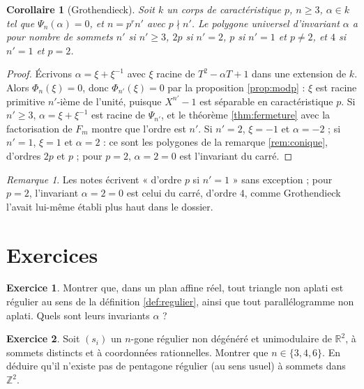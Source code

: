 \documentclass[11pt,a4paper]{article}
\theoremstyle{plain}
\newtheorem{corollaire}[theoreme]{Corollaire}
\theoremstyle{definition}
\newtheorem{exercice}{Exercice}
\theoremstyle{remark}
\newtheorem{remarque}[theoreme]{Remarque}
\newcommand{\Z}{\mathbb{Z}}
\newcommand{\R}{\mathbb{R}}
\begin{document}
\begin{corollaire}[Grothendieck]\label{cor:ordre}
Soit $k$ un corps de caractéristique $p$, $n\geq3$, $\alpha\in k$ tel que $\Psi_n(\alpha)=0$, et $n=p^rn'$ avec $p\nmid n'$. Le polygone universel d'invariant $\alpha$ a pour nombre de sommets $n'$ si $n'\geq3$, $2p$ si $n'=2$, $p$ si $n'=1$ et $p\neq2$, et $4$ si $n'=1$ et $p=2$.
\end{corollaire}

\begin{proof}
Écrivons $\alpha=\xi+\xi^{-1}$ avec $\xi$ racine de $T^2-\alpha T+1$ dans une extension de $k$. Alors $\Phi_n(\xi)=0$, donc $\Phi_{n'}(\xi)=0$ par la proposition \ref{prop:modp} : $\xi$ est racine primitive $n'$-ième de l'unité, puisque $X^{n'}-1$ est séparable en caractéristique $p$. Si $n'\geq3$, $\alpha=\xi+\xi^{-1}$ est racine de $\Psi_{n'}$, et le théorème \ref{thm:fermeture} avec la factorisation de $F_m$ montre que l'ordre est $n'$. Si $n'=2$, $\xi=-1$ et $\alpha=-2$ ; si $n'=1$, $\xi=1$ et $\alpha=2$ : ce sont les polygones de la remarque \ref{rem:conique}, d'ordres $2p$ et $p$ ; pour $p=2$, $\alpha=2=0$ est l'invariant du carré.
\end{proof}

\begin{remarque}
Les notes écrivent « d'ordre $p$ si $n'=1$ » sans exception ; pour $p=2$, l'invariant $\alpha=2=0$ est celui du carré, d'ordre $4$, comme Grothendieck l'avait lui-même établi plus haut dans le dossier.
\end{remarque}

\section{Exercices}

\begin{exercice}\label{exo:triangle}
Montrer que, dans un plan affine réel, tout triangle non aplati est régulier au sens de la définition \ref{def:regulier}, ainsi que tout parallélogramme non aplati. Quels sont leurs invariants $\alpha$ ?
\end{exercice}

\begin{exercice}\label{exo:pentagone}
Soit $(s_i)$ un $n$-gone régulier non dégénéré et unimodulaire de $\R^2$, à sommets distincts et à coordonnées rationnelles. Montrer que $n\in\{3,4,6\}$. En déduire qu'il n'existe pas de pentagone régulier (au sens usuel) à sommets dans $\Z^2$.
\end{exercice}
\end{document}
